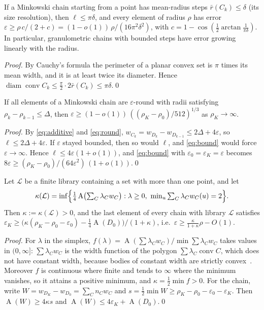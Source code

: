 \documentclass[runningheads]{llncs}
\newcommand{\conv}{\operatorname{conv}}
\newcommand{\A}{\operatorname{A}}
\newcommand{\diam}{\operatorname{diam}}
\begin{document}
\begin{corollary}\label{cor:mean}
If a Minkowski chain starting from a point has mean-radius steps $\bar r(C_k)\le\delta$ (its size resolution), then $\ell\le\pi\delta$, and every element of radius $\rho$ has error $\varepsilon\ge\rho\,c/(2+c)=(1-o(1))\,\rho/(16\pi^2\delta^2)$, with $c=1-\cos(\frac12\arctan\frac1{\pi\delta})$. In particular, granulometric chains with bounded steps have error growing linearly with the radius.
\end{corollary}
\begin{proof}
By Cauchy's formula the perimeter of a planar convex set is $\pi$ times its mean width, and it is at least twice its diameter. Hence $\diam\conv C_k\le\frac\pi2\cdot2\bar r(C_k)\le\pi\delta$.\qed
\end{proof}

\begin{corollary}\label{cor:fitted}
If all elements of a Minkowski chain are $\varepsilon$-round with radii satisfying $\rho_k-\rho_{k-1}\le\Delta$, then $\varepsilon\ge(1-o(1))\,((\rho_K-\rho_0)/512)^{1/3}$ as $\rho_K\to\infty$.
\end{corollary}
\begin{proof}
By \eqref{eq:additive} and \eqref{eq:round}, $w_{C_k}=w_{D_k}-w_{D_{k-1}}\le2\Delta+4\varepsilon$, so $\ell\le2\Delta+4\varepsilon$. If $\varepsilon$ stayed bounded, then so would $\ell$, and \eqref{eq:bound} would force $\varepsilon\to\infty$. Hence $\ell\le4\varepsilon(1+o(1))$, and \eqref{eq:bound} with $\varepsilon_0=\varepsilon_K=\varepsilon$ becomes $8\varepsilon\ge(\rho_K-\rho_0)/(64\varepsilon^2)\,(1+o(1))$.\qed
\end{proof}

\begin{corollary}\label{cor:library}
Let $\mathcal L$ be a finite library containing a set with more than one point, and let
\[\kappa(\mathcal L)=\inf\Bigl\{\tfrac14\A\bigl(\textstyle\sum_C\lambda_Cw_C\bigr):\lambda\ge0,\ \min_u\textstyle\sum_C\lambda_Cw_C(u)=2\Bigr\}.\]
Then $\kappa:=\kappa(\mathcal L)>0$, and the last element of every chain with library $\mathcal L$ satisfies $\varepsilon_K\ge\bigl(\kappa(\rho_K-\rho_0-\varepsilon_0)-\frac14\A(D_0)\bigr)/(1+\kappa)$, i.e.\ $\varepsilon\ge\frac{\kappa}{1+\kappa}\rho-O(1)$.
\end{corollary}
\begin{proof}
For $\lambda$ in the simplex, $f(\lambda)=\A(\sum\lambda_Cw_C)/\min\sum\lambda_Cw_C$ takes values in $(0,\infty]$: $\sum\lambda_Cw_C$ is the width function of the polygon $\sum\lambda_C\conv C$, which does not have constant width, because bodies of constant width are strictly convex~\cite{schneider2014}. Moreover $f$ is continuous where finite and tends to $\infty$ where the minimum vanishes, so it attains a positive minimum, and $\kappa=\frac12\min f>0$. For the chain, write $W=w_{D_K}-w_{D_0}=\sum_Cn_Cw_C$ and $s=\frac12\min W\ge\rho_K-\rho_0-\varepsilon_0-\varepsilon_K$. Then $\A(W)\ge4\kappa s$ and $\A(W)\le4\varepsilon_K+\A(D_0)$.\qed
\end{proof}
\end{document}
